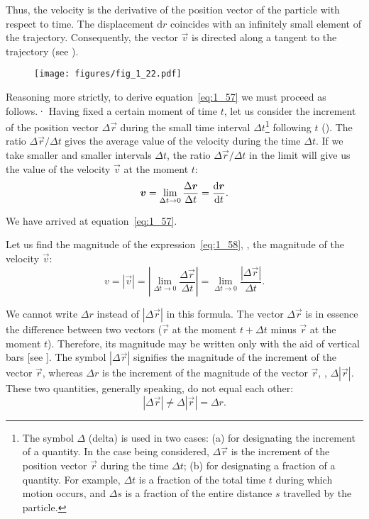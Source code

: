 \noindent
Thus, the velocity is the derivative of the position vector of the particle with respect to time. The displacement $\mathrm{d}r$ coincides with an infinitely small element of the trajectory. Consequently, the vector $\vec{v}$ is directed along a tangent to the trajectory (see ).

\begin{figure}[t]
	\begin{center}
		\texttt{[image: figures/fig\_1\_22.pdf]}
		\caption[]{}
		\label{fig:1_22}
	\end{center}
\vspace{-0.7cm}
\end{figure}

Reasoning more strictly, to derive equation~\eqref{eq:1_57} we must proceed as follows.· Having fixed a certain moment of time $t$, let us consider the increment of the position vector $\Delta\vec{r}$ during the small time interval $\Delta t$\footnote{The symbol $\Delta$ (delta) is used in two cases: (a) for designating the increment of a quantity. In the case being considered, $\Delta\vec{r}$ is the increment of the position vector $\vec{r}$ during the time $\Delta t$; (b) for designating a fraction of a quantity. For example, $\Delta t$ is a fraction of the total time $t$ during which motion occurs, and $\Delta s$ is a fraction of the entire 	distance $s$ travelled by the particle.} following $t$ (). The ratio $\Delta\vec{r}/\Delta t$ gives the average value of the velocity during the time $\Delta t$. If we take smaller and smaller intervals $\Delta t$, the ratio $\Delta\vec{r}/\Delta t$ in the limit will give us the value of the velocity $\vec{v}$ at the moment $t$:
\begin{equation}\label{eq:1_58}
\boldsymbol{v} = \lim_{\Delta t\to 0} \frac{\Delta\boldsymbol{r}}{\Delta t} = \frac{\mathrm{d}\boldsymbol{r}}{\mathrm{d} t}.
\end{equation}

\noindent
We have arrived at equation~\eqref{eq:1_57}.

Let us find the magnitude of the expression~\eqref{eq:1_58}, \ie, the magnitude of the velocity $\vec{v}$:
\begin{equation}\label{eq:1_59}
v = |\vec{v}| = \left|\lim_{\Delta t\to 0} \frac{\Delta\vec{r}}{\Delta t}\right| = \lim_{\Delta t\to 0} \frac{|\Delta\vec{r}|}{\Delta t}.
\end{equation}

\noindent
We cannot write $\Delta r$ instead of $|\Delta\vec{r}|$ in this formula. The vector $\Delta\vec{r}$ is in essence the difference between two vectors ($\vec{r}$ at the moment $t+\Delta t$ minus $\vec{r}$ at the moment $t$). Therefore, its magnitude may be written only with the aid of vertical
bars [see ]. The symbol $|\Delta\vec{r}|$ signifies the magnitude of the increment of the vector $\vec{r}$, whereas $\Delta r$ is the increment of the magnitude of the vector $\vec{r}$, \ie, $\Delta|\vec{r}|$. These two quantities, generally speaking, do not equal each other:
\begin{equation*}
|\Delta\vec{r}| \neq \Delta|\vec{r}| = \Delta r.
\end{equation*}

